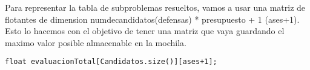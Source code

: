 Para representar la tabla de subproblemas resueltos, vamos a usar una matriz de flotantes de dimension numdecandidatos(defensas) * presupuesto + 1 (ases+1).
Esto lo hacemos con el objetivo de tener una matriz que vaya guardando el maximo valor posible almacenable en la mochila.

\begin{lstlisting}[frame=single,basicstyle=\tiny,title={Estructura de datos seleccionada para la tabla de subproblemas resueltos}]
	float evaluacionTotal[Candidatos.size()][ases+1];
\end{lstlisting}
